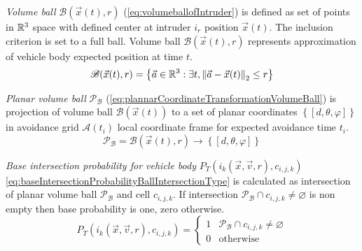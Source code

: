 \noindent\emph{Volume ball} $\mathscr{B}(\vec{x}(t),r)$ (\ref{eq:volumeballofIntruder}) is defined as set of points in $\mathbb{R}^3$ space with defined center at intruder $i_r$ position $\vec{x}(t)$. The inclusion criterion is set to a full ball. Volume ball $\mathscr{B}(\vec{x}(t),r)$ represents approximation of vehicle body expected position at time $t$.
\begin{equation}\label{eq:volumeballofIntruder}
    \mathscr{B}(\vec{x}(t),r)= \left\{\vec{a}\in\mathbb{R}^3:\exists t,\left\lVert\vec{a}-\vec{x}(t)\right\rVert_2\le r\right\}
\end{equation}

\noindent\emph{Planar volume ball} $\mathscr{P}_\mathscr{B}$ (\ref{eq:plannarCoordinateTransformationVolumeBall}) is projection of volume ball $\mathscr{B}(\vec{x}(t))$ to a set of planar coordinates $\left\{[d,\theta,\varphi]\right\}$ in avoidance grid $\mathscr{A}(t_i)$ local coordinate frame for expected avoidance time $t_i$.
\begin{equation}\label{eq:plannarCoordinateTransformationVolumeBall}
    \mathscr{P}_\mathscr{B}=\mathscr{B}(\vec{x}(t),r)\to \left\{[d,\theta,\varphi]\right\}
\end{equation}

\noindent\emph{Base intersection probability for vehicle body} $P_T(i_k(\vec{x},\vec{v},r),c_{i,j,k})$ \ref{eq:baseIntersectionProbabilityBallIntersectionType} is calculated as intersection of planar volume ball $\mathscr{P}_\mathscr{B}$ and cell $c_{i,j,k}$. If intersection $\mathscr{P}_\mathscr{B}\cap c_{i,j,k} \neq \varnothing$ is non empty then base probability is one, zero otherwise.
\begin{equation}\label{eq:baseIntersectionProbabilityBallIntersectionType}
    P_T(i_k(\vec{x},\vec{v},r),c_{i,j,k})=
    \begin{cases}
        1&\mathscr{P}_\mathscr{B}\cap c_{i,j,k} \neq \varnothing\\
        0&\text{otherwise}
    \end{cases}
\end{equation}

